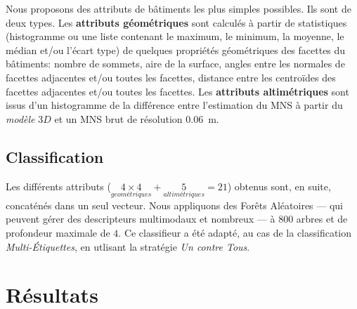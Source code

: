\documentclass[a4paper,french]{article}
\begin{document}
    Nous proposons des attributs de bâtiments les plus simples possibles. Ils sont de deux types. Les \textbf{attributs géométriques} sont calculés à partir de statistiques (histogramme ou une liste contenant le maximum, le minimum, la moyenne, le médian et/ou l'écart type) de quelques propriétés géométriques des facettes du bâtiments: nombre de sommets, aire de la surface, angles entre les normales de facettes adjacentes et/ou toutes les facettes, distance entre les centroïdes des facettes adjacentes et/ou toutes les facettes. Les \textbf{attributs altimétriques} sont issus d'un histogramme de la différence entre l'estimation du MNS à partir du \textit{modèle} $3D$ et un MNS brut de résolution \SI{0,06}{m}.
    \subsection{Classification}

    Les différents attributs ($\underset{geométriques}{4\times4} + \underset{altimétriques}{5} = 21$) obtenus sont, en suite, concaténés dans un seul vecteur. Nous appliquons des Forêts Aléatoires --- qui peuvent gérer des descripteurs multimodaux et nombreux --- à $800$ arbres et de profondeur maximale de $4$. Ce classifieur a été adapté, au cas de la classification \emph{Multi-\'Etiquettes}, en utlisant la stratégie \emph{Un contre Tous}.

    \section{Résultats}
\end{document}
